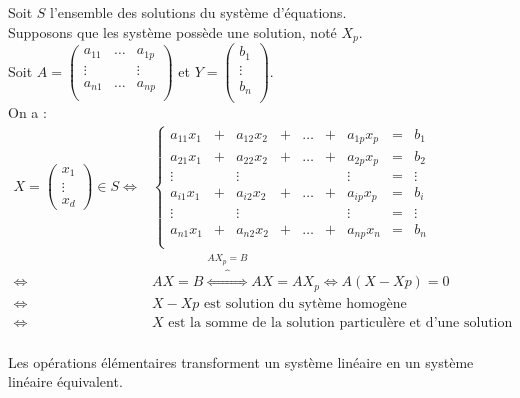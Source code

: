 \documentclass{book}
\begin{document}
\begin{Demonstration}
Soit $S$ l'ensemble des solutions du système d'équations.\\ Supposons que les système  possède une solution, noté $X_p$.\\
Soit $A=\begin{pmatrix}
a_{11}&\dots&a_{1p}\\
\vdots &&\vdots \\
a_{n1}&\dots&a_{np}\\
\end{pmatrix}
$ et $Y=\begin{pmatrix}
b_{1}\\
\vdots\\
b_{n}\\
\end{pmatrix}.$\\
On a :
$$
\begin{aligned}
X=\begin{pmatrix}
x_1 \\ \vdots \\ x_d
\end{pmatrix} \in S \Leftrightarrow& \left\{{\begin{matrix}
a_{11}x_{1}&+&a_{12}x_{2}&+&\dots &+&a_{1p}x_{p}&=&b_{1}\\
a_{21}x_{1}&+&a_{22}x_{2}&+&\dots &+&a_{2p}x_{p}&=&b_{2}\\
\vdots&&\vdots&& &&\vdots&=&\vdots \\
a_{i1}x_{1}&+&a_{i2}x_{2}&+&\dots &+&a_{ip}x_{p}&=&b_{i}\\
\vdots&&\vdots&& &&\vdots&=&\vdots \\
a_{n1}x_{1}&+&a_{n2}x_{2}&+&\dots &+&a_{np}x_{n}&=&b_{n}\\
\end{matrix}}\right. \\\Leftrightarrow&  AX=B\overbrace{\Leftrightarrow}^{AX_p=B}  AX=AX_p\Leftrightarrow A(X-Xp)=0\\
\Leftrightarrow& X-Xp\text{ est solution du sytème homogène }\\
\Leftrightarrow& X\text{  est la somme de la solution particulère et d'une solution du système homogène}\\
\end{aligned}
$$
\end{Demonstration}
\begin{Proposition}
Les opérations élémentaires transforment un système linéaire en un système linéaire équivalent.
\end{Proposition}
\end{document}
